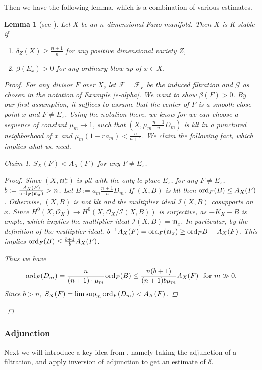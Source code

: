 \documentclass[12pt,reqno]{amsart}%
\newcommand{\cF}{\mathcal{F}}
\newcommand{\ord}{{\rm ord}}
\newtheorem{lem}[thm]{Lemma}
\theoremstyle{definition}
\theoremstyle{remark}
\newtheorem{claim}[thm]{Claim}
\newcommand{\cG}{{\mathcal{G}}}
\newcommand{\fm}{{\mathfrak{m}}}
\begin{document}
Then we have the following lemma, which is a combination of various estimates.
\begin{lem}[{see \cite[Theorem 1.6]{Zhu20b}}]\label{l-multiplier}
Let $X$ be an $n$-dimensional Fano manifold. Then $X$ is K-stable if
\begin{enumerate}
\item   $\delta_Z(X)\ge\frac{n+1}{n}$ for any positive dimensional variety $Z$,
\item $\beta(E_x)>0$ for any ordinary blow up of $x\in X$.
\end{enumerate}
\begin{proof}For any divisor $F$ over $X$, let $\cF=\cF_F$ be the induced filtration and $\cG$ as chosen in the notation of Example \ref{e-alpha}. We want to show $\beta(F)>0$. By our first assumption, it suffices to assume that the center of $F$ is a smooth close point $x$ and $F\neq E_x$.  Using the notation there, we know for we can choose a sequence of constant $\mu_m\to 1$, such that $(X, \mu_m\frac{n+1}nD_m)$ is klt in a punctured neighborhood of $x$ and $\mu_m(1-ra_m)<\frac n{n+1}$. We claim the following fact, which implies what we need.
\begin{claim}$S_X(F)<A_X(F)$ for any $F\neq E_x$.
\end{claim}
\begin{proof}
 Since $(X,\fm^n_x)$ is plt with the only lc place $E_x$, for any $F\neq E_x$, $b:=\frac{A_{X}(F)}{\ord_F(\fm_x)}>n$.  Let $B:=a_m\frac{n+1}nD_m$. If $(X,B)$ is klt then $\ord_F(B)\le A_X(F)$. Otherwise, $(X,B)$ is not klt and  the multiplier ideal $ \mathcal{I}(X,B)$ cosupports on $x$. Since $H^0(X,\mathcal{O}_X)\to H^0(X, \mathcal{O}_X/ \mathcal{I}(X,B))$ is surjective, as $-K_X-B$ is ample, which implies the multiplier ideal $\mathcal{I}(X,B)=\fm_x$. In particular, by the definition of the multiplier ideal, $b^{-1}A_X(F)=\ord_F(\fm_x)\ge \ord_{F}B-A_{X}(F)$. 
 This implies $\ord_F(B)\le \frac{b+1}{b}A_X(F)$.  
 
 Thus we have
 $$\ord_F(D_m)= \frac{n}{(n+1)\cdot \mu_m} \ord_F(B) \le\frac{n(b+1)}{(n+1)b\mu_m}A_X(F) \mbox{\ \  for $m\gg 0$}.$$
Since  $b>n$, $S_X(F)=\limsup_m \ord_F(D_m)<A_X(F)$.
 \end{proof}
\end{proof}
\end{lem}
\subsubsection{Adjunction}\label{sss-adjunction} Next we will introduce a key idea from \cite{AZ20}, namely taking the adjunction of a filtration, and apply inversion of adjunction to get an estimate of $\delta$. 
\end{document}
